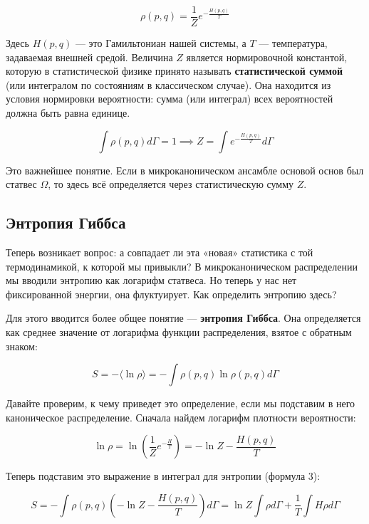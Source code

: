 \documentclass[../general/general]{subfiles}
\begin{document}
\begin{equation}
\rho(p, q) = \frac{1}{Z} e^{-\frac{H(p, q)}{T}}
\end{equation}

Здесь $H(p, q)$ — это Гамильтониан нашей системы, а $T$ — температура, задаваемая внешней средой. Величина $Z$ является нормировочной константой, которую в статистической физике принято называть \textbf{статистической суммой} (или интегралом по состояниям в классическом случае). Она находится из условия нормировки вероятности: сумма (или интеграл) всех вероятностей должна быть равна единице.

\begin{equation}
\int \rho(p, q) d\Gamma = 1 \implies Z = \int e^{-\frac{H(p, q)}{T}} d\Gamma
\end{equation}

Это важнейшее понятие. Если в микроканоническом ансамбле основой основ был статвес $\Omega$, то здесь всё определяется через статистическую сумму $Z$.

\subsection{Энтропия Гиббса}

Теперь возникает вопрос: а совпадает ли эта «новая» статистика с той термодинамикой, к которой мы привыкли? В микроканоническом распределении мы вводили энтропию как логарифм статвеса. Но теперь у нас нет фиксированной энергии, она флуктуирует. Как определить энтропию здесь?

Для этого вводится более общее понятие — \textbf{энтропия Гиббса}. Она определяется как среднее значение от логарифма функции распределения, взятое с обратным знаком:

\begin{equation}
S = - \langle \ln \rho \rangle = - \int \rho(p, q) \ln \rho(p, q) d\Gamma
\end{equation}

Давайте проверим, к чему приведет это определение, если мы подставим в него каноническое распределение. Сначала найдем логарифм плотности вероятности:

\begin{equation}
\ln \rho = \ln \left( \frac{1}{Z} e^{-\frac{H}{T}} \right) = - \ln Z - \frac{H(p, q)}{T}
\end{equation}

Теперь подставим это выражение в интеграл для энтропии (формула 3):

\begin{equation}
S = - \int \rho(p, q) \left( - \ln Z - \frac{H(p, q)}{T} \right) d\Gamma = \ln Z \int \rho d\Gamma + \frac{1}{T} \int H \rho d\Gamma
\end{equation}
\end{document}
